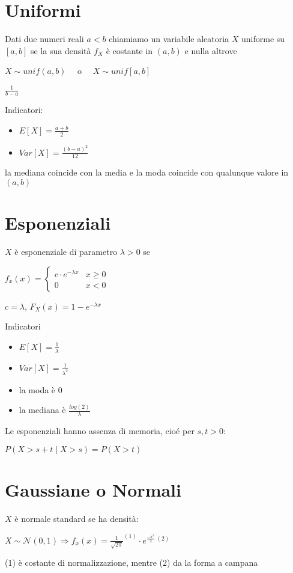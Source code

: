 \documentclass[12pt, a4paper]{article}
\begin{document}
\section{Uniformi}
Dati due numeri reali $a<b$ chiamiamo un variabile aleatoria $X$ uniforme su $[a,b]$ se 
la sua densità $f_{X}$ è costante in $(a,b)$ e nulla altrove
\begin{center}
    $X\sim unif(a,b)\quad$ o $\quad X\sim unif[a,b]$

    $\frac{1}{b-a}$
\end{center}

Indicatori:
\begin{itemize}
    \item $E[X]=\frac{a+b}{2}$
    \item $Var[X]=\frac{(b-a)^{2}}{12}$
\end{itemize}
la mediana coincide con la media e la moda coincide con qualunque valore in $(a,b)$

\section{Esponenziali}
$X$ è esponenziale di parametro $\lambda>0$ se
\begin{center}
    $f_{x}(x)=\begin{cases}
        c\cdot e^{-\lambda x} & x\geq 0\\
        0 & x<0
    \end{cases}$
\end{center}
$c=\lambda$, $F_{X}(x)=1-e^{-\lambda x}$

Indicatori
\begin{itemize}
    \item $E[X]=\frac{1}{\lambda}$
    \item $Var[X]=\frac{1}{\lambda^{2}}$
    \item la moda è $0$
    \item la mediana è $\frac{log(2)}{\lambda}$
\end{itemize}
Le esponenziali hanno assenza di memoria, cioé per $s,t>0$:
\begin{center}
    $P(X>s+t\mid X>s)=P(X>t)$
\end{center}

\newpage
\section{Gaussiane o Normali} $X$ è normale standard se ha densità:
\begin{center}
     $X\sim \mathcal{N}(0,1)\Rightarrow f_{x}(x)=\frac{1}{\sqrt{2\pi}}^{(1)}\cdot e^{\frac{-x^{2}}{2}\ (2)}$
\end{center}
(1) è costante di normalizzazione, mentre (2) da la forma a campana
\end{document}
